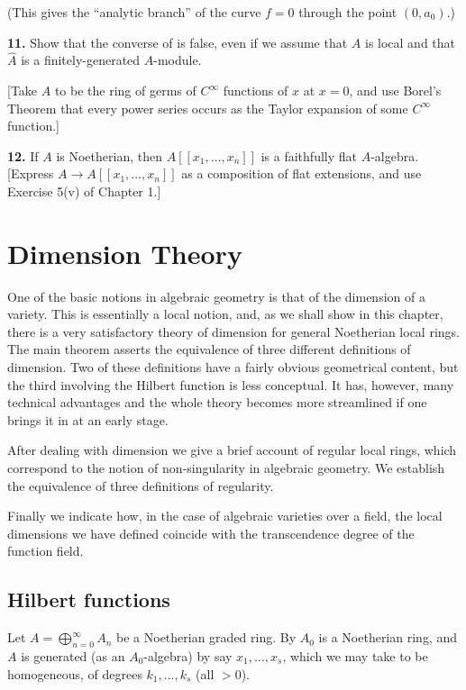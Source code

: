 (This gives the ``analytic branch'' of the curve $f=0$ through the point $(0,a_0)$.)

\medskip
\noindent\textbf{11.} Show that the converse of  is false, even if we assume that $A$ is local and
that $\widehat A$ is a finitely-generated $A$-module.

[Take $A$ to be the ring of germs of $C^\infty$ functions of $x$ at $x=0$, and use Borel's
Theorem that every power series occurs as the Taylor expansion of some $C^\infty$
function.]

\medskip
\noindent\textbf{12.} If $A$ is Noetherian, then $A[[x_1,\ldots,x_n]]$ is a faithfully flat $A$-algebra.  [Express
$A\longrightarrow A[[x_1,\ldots,x_n]]$ as a composition of flat extensions, and use Exercise 5(v)
of Chapter 1.]

\section{Dimension Theory}

One of the basic notions in algebraic geometry is that of the dimension of a
variety.  This is essentially a local notion, and, as we shall show in this chapter,
there is a very satisfactory theory of dimension for general Noetherian local
rings.  The main theorem asserts the equivalence of three different definitions of
dimension.  Two of these definitions have a fairly obvious geometrical content,
but the third involving the Hilbert function is less conceptual.  It has, however,
many technical advantages and the whole theory becomes more streamlined if
one brings it in at an early stage.

After dealing with dimension we give a brief account of regular local rings,
which correspond to the notion of non-singularity in algebraic geometry.  We
establish the equivalence of three definitions of regularity.

Finally we indicate how, in the case of algebraic varieties over a field, the
local dimensions we have defined coincide with the transcendence degree of the
function field.

\subsection{Hilbert functions}

Let $A=\bigoplus_{n=0}^\infty A_n$ be a Noetherian graded ring.  By  $A_0$ is a Noetherian
ring, and $A$ is generated (as an $A_0$-algebra) by say $x_1,\ldots,x_s$, which we may take
to be homogeneous, of degrees $k_1,\ldots,k_s$ (all $>0$).


